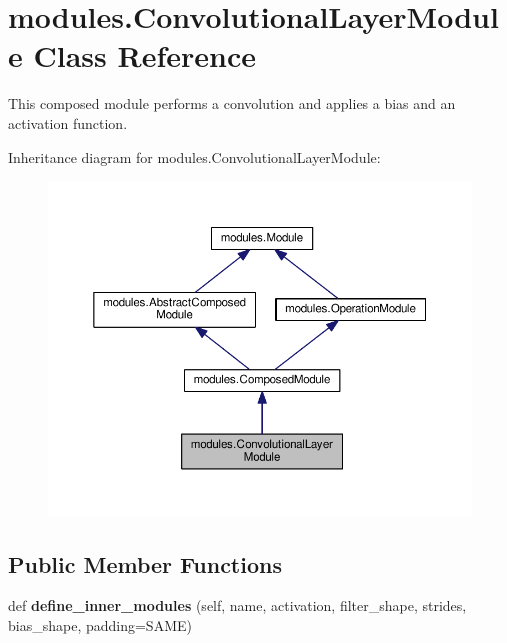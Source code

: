 \hypertarget{classmodules_1_1_convolutional_layer_module}{}\section{modules.\+Convolutional\+Layer\+Module Class Reference}
\label{classmodules_1_1_convolutional_layer_module}


This composed module performs a convolution and applies a bias and an activation function.  




Inheritance diagram for modules.\+Convolutional\+Layer\+Module\+:\nopagebreak
\begin{figure}[H]
\begin{center}
\leavevmode
\includegraphics[width=350pt]{classmodules_1_1_convolutional_layer_module__inherit__graph}
\end{center}
\end{figure}
\subsection*{Public Member Functions}
\begin{DoxyCompactItemize}
\item 
\mbox{\label{classmodules_1_1_convolutional_layer_module_aaa6eabaf3b9d4058bc29e11a49132170}} 
def {\bfseries define\+\_\+inner\+\_\+modules} (self, name, activation, filter\+\_\+shape, strides, bias\+\_\+shape, padding=\textquotesingle{}S\+A\+ME\textquotesingle{})
\end{DoxyCompactItemize}
